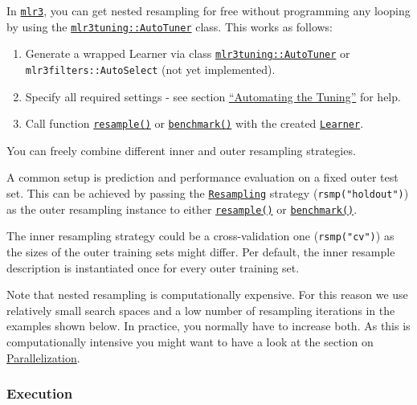 \documentclass[]{article}
\providecommand{\tightlist}{%
  \setlength{\itemsep}{0pt}\setlength{\parskip}{0pt}}
\begin{document}
In \href{https://github.com/mlr-org/mlr3}{\texttt{mlr3}}, you can get nested resampling for free without programming any looping by using the \href{https://mlr3tuning.mlr-org.com/reference/AutoTuner.html}{\texttt{mlr3tuning::AutoTuner}} class.
This works as follows:

\begin{enumerate}
\def\labelenumi{\arabic{enumi}.}
\tightlist
\item
  Generate a wrapped Learner via class \href{https://mlr3tuning.mlr-org.com/reference/AutoTuner.html}{\texttt{mlr3tuning::AutoTuner}} or \texttt{mlr3filters::AutoSelect} (not yet implemented).
\item
  Specify all required settings - see section \protect\hyperlink{autotuner}{``Automating the Tuning''} for help.
\item
  Call function \href{https://mlr3.mlr-org.com/reference/resample.html}{\texttt{resample()}} or \href{https://mlr3.mlr-org.com/reference/benchmark.html}{\texttt{benchmark()}} with the created \href{https://mlr3.mlr-org.com/reference/Learner.html}{\texttt{Learner}}.
\end{enumerate}

You can freely combine different inner and outer resampling strategies.

A common setup is prediction and performance evaluation on a fixed outer test set. This can be achieved by passing the \href{https://mlr3.mlr-org.com/reference/Resampling.html}{\texttt{Resampling}} strategy (\texttt{rsmp("holdout")}) as the outer resampling instance to either \href{https://mlr3.mlr-org.com/reference/resample.html}{\texttt{resample()}} or \href{https://mlr3.mlr-org.com/reference/benchmark.html}{\texttt{benchmark()}}.

The inner resampling strategy could be a cross-validation one (\texttt{rsmp("cv")}) as the sizes of the outer training sets might differ.
Per default, the inner resample description is instantiated once for every outer training set.

Note that nested resampling is computationally expensive.
For this reason we use relatively small search spaces and a low number of resampling iterations in the examples shown below.
In practice, you normally have to increase both.
As this is computationally intensive you might want to have a look at the section on \protect\hyperlink{parallelization}{Parallelization}.

\hypertarget{nested-resamp-exec}{%
\subsubsection{Execution}\label{nested-resamp-exec}}
\end{document}
